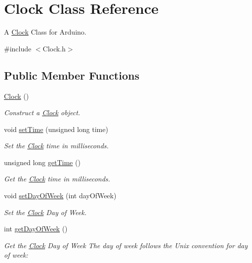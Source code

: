 \hypertarget{class_clock}{\section{Clock Class Reference}
\label{class_clock}
}


A \hyperlink{class_clock}{Clock} Class for Arduino.  




{\ttfamily \#include $<$Clock.\-h$>$}

\subsection*{Public Member Functions}
\begin{DoxyCompactItemize}
\item 
\hyperlink{class_clock_adbc370eb6b5f8d01645cf440188160a8}{Clock} ()
\begin{DoxyCompactList}\small\item\em Construct a \hyperlink{class_clock}{Clock} object. \end{DoxyCompactList}\item 
void \hyperlink{class_clock_a92d1b6aaae12a00f3627924eb473c0da}{set\-Time} (unsigned long time)
\begin{DoxyCompactList}\small\item\em Set the \hyperlink{class_clock}{Clock} time in milliseconds. \end{DoxyCompactList}\item 
unsigned long \hyperlink{class_clock_a591c3c531785b7442f91aecc1b7cbb36}{get\-Time} ()
\begin{DoxyCompactList}\small\item\em Get the \hyperlink{class_clock}{Clock} time in milliseconds. \end{DoxyCompactList}\item 
void \hyperlink{class_clock_a37b31e0a04e24483780398f4d53e3b70}{set\-Day\-Of\-Week} (int day\-Of\-Week)
\begin{DoxyCompactList}\small\item\em Set the \hyperlink{class_clock}{Clock} Day of Week. \end{DoxyCompactList}\item 
int \hyperlink{class_clock_a430fe7500838a0d978e8b00d01e26811}{get\-Day\-Of\-Week} ()
\begin{DoxyCompactList}\small\item\em Get the \hyperlink{class_clock}{Clock} Day of Week The day of week follows the Unix convention for day of week\-:\par

\end{DoxyCompactList}
\end{DoxyCompactItemize}

